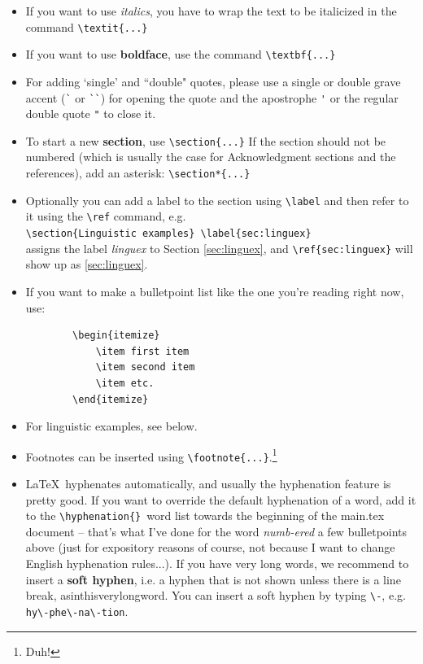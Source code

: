 \begin{itemize}
    \item If you want to use \textit{italics}, you have to wrap the text to be italicized in the command \verb!\textit{...}!
    \item If you want to use \textbf{boldface}, use the command \verb!\textbf{...}!
    \item For adding `single' and ``double" quotes, please use a single or double grave accent (\verb!`! or \verb!``!) for opening the quote and the apostrophe \verb!'! or the regular double quote \verb!"! to close it.
    \item To start a new \textbf{section}, use \verb!\section{...}! If the section should not be numbered (which is usually the case for Acknowledgment sections and the references), add an asterisk: \verb!\section*{...}!
    \item Optionally you can add a label to the section using \verb!\label! and then refer to it using the \verb!\ref! command, e.g. \\ \verb!\section{Linguistic examples} \label{sec:linguex}! \\ assigns the label \textit{linguex} to Section \ref{sec:linguex}, and \verb!\ref{sec:linguex}! will show up as \ref{sec:linguex}.
    \item If you want to make a bulletpoint list like the one you're reading right now, use:
    \begin{verbatim}
        \begin{itemize}
            \item first item
            \item second item
            \item etc.
        \end{itemize}
    \end{verbatim}
    \item For linguistic examples, see below.
    \item Footnotes can be inserted using \verb!\footnote{...}!.\footnote{Duh!}
    \item \LaTeX \ hyphenates automatically, and usually the hyphenation feature is pretty good. If you want to override the default hyphenation of a word, add it to the \verb!\hyphenation{}!\ word list towards the beginning of the main.tex document -- that's what I've done for the word \textit{numb-ered} a few bulletpoints above (just for expository reasons of course, not because I want to change English hyphenation rules...). If you have very long words, we recommend to insert a \textbf{soft hyphen}, i.e. a hyphen that is not shown unless there is a line break, as\-in\-this\-very\-long\-word. You can insert a soft hyphen by typing \verb!\-!, e.g. \verb!hy\-phe\-na\-tion!.
    

\end{itemize}

